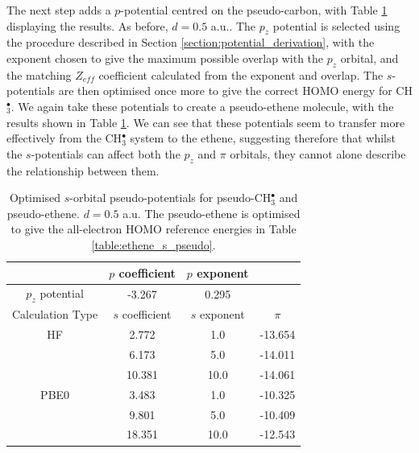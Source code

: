 \documentclass[journal=jctcce,manuscript=article]{achemso}
\begin{document}
The next step adds a \(p\)-potential centred on the pseudo-carbon, with Table \ref{table:p_potentials} displaying the results. As before, \(d = 0.5\) a.u.. The \(p_{z}\) potential is selected using the procedure described in Section \ref{section:potential_derivation}, with the exponent chosen to give the maximum possible overlap with the \(p_{z}\) orbital, and the matching \(Z_{eff}\) coefficient calculated from the exponent and overlap. The \(s\)-potentials are then optimised once more to give the correct HOMO energy for CH\(^{\bullet}_{3}\). We again take these potentials to create a pseudo-ethene molecule, with the results shown in Table \ref{table:p_potentials}. We can see that these potentials seem to transfer more effectively from the CH\(^{\bullet}_{3}\) system to the ethene, suggesting therefore that whilst the \(s\)-potentials can affect both the \(p_{z}\) and \(\pi\) orbitals, they 
cannot alone describe the relationship between them.

\begin{table}[ht]
\caption{Optimised \(s\)-orbital pseudo-potentials for pseudo-CH\(^{\bullet}_{3}\) and pseudo-ethene. \(d = 0.5\) a.u. The pseudo-ethene is optimised to give the all-electron HOMO reference energies in Table \ref{table:ethene_s_pseudo}.}
\begin{tabular}{c c c c}
\hline
& \(p\) coefficient & \(p\) exponent \\
\hline
\(p_{z}\) potential & -3.267 & 0.295 \\
\hline
Calculation Type & \(s\) coefficient & \(s\) exponent & \(\pi\) \\
\hline\hline
HF & 2.772 & 1.0 & -13.654 \\
 & 6.173 & 5.0 & -14.011 \\
 & 10.381 & 10.0 & -14.061 \\
\hline
PBE0 & 3.483 & 1.0 & -10.325 \\
 & 9.801 & 5.0 & -10.409 \\
 & 18.351 & 10.0 & -12.543 \\
\hline
\end{tabular}
\label{table:p_potentials}
\end{table}
\end{document}
